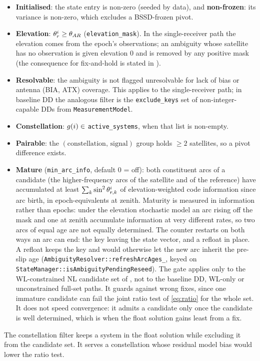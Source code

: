 \documentclass[main.tex]{subfiles}
\begin{document}
\begin{itemize}[leftmargin=*, itemsep=0pt]
\item \textbf{Initialised}: the state entry is non-zero (seeded by
      data), and \textbf{non-frozen}: its variance is non-zero, which
      excludes a BSSD-frozen pivot.
\item \textbf{Elevation}: $\theta^i_r \ge \theta_{AR}$
      (\texttt{elevation\_mask}).  In the single-receiver path the
      elevation comes from the epoch's observations; an ambiguity whose
      satellite has no observation is given elevation 0 and is removed
      by any positive mask (the consequence for fix-and-hold is stated
      in ).
\item \textbf{Resolvable}: the ambiguity is not flagged unresolvable
      for lack of bias or antenna (BIA, ATX) coverage.  This applies to
      the single-receiver path; in baseline DD the analogous filter is
      the \texttt{exclude\_keys} set of non-integer-capable DDs from
      \texttt{MeasurementModel}.
\item \textbf{Constellation}: $g(i) \in$
      \texttt{active\_systems}, when that list is non-empty.
\item \textbf{Pairable}: the $(\text{constellation},\,\text{signal})$
      group holds $\ge 2$ satellites, so a pivot difference exists.
\item \textbf{Mature} (\texttt{min\_arc\_info}, default $0$ = off):
      both constituent arcs of a candidate (the higher-frequency arcs of
      the satellite and of the reference) have accumulated at least
      $\sum_k \sin^2\theta^i_{r,k}$ of elevation-weighted code
      information since arc birth, in epoch-equivalents at zenith.
      Maturity is measured in information rather than epochs: under the
      elevation stochastic model an arc rising off the mask and one at
      zenith accumulate information at very different rates, so two
      arcs of equal age are not equally determined.  The counter
      restarts on both ways an arc can end: the key leaving the state
      vector, and a refloat in place.  A refloat keeps the key and would
      otherwise let the new arc inherit the pre-slip age
      (\texttt{AmbiguityResolver::refreshArcAges\_}, keyed on
      \texttt{StateManager::isAmbiguityPendingReseed}).  The gate applies
      only to the WL-constrained NL candidate set of ,
      not to the baseline DD, WL-only or unconstrained full-set paths.
      It guards against wrong fixes, since one immature candidate can
      fail the joint ratio test of \eqref{eq:ratio} for the whole set.
      It does not speed convergence: it admits a candidate only once the
      candidate is well determined, which is when the float solution
      gains least from a fix.
\end{itemize}
The constellation filter keeps a system in the float solution while
excluding it from the candidate set.  It serves a constellation whose
residual model bias would lower the ratio test.
\end{document}
